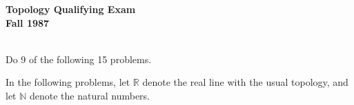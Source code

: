 \documentclass{article}
\def\R{\mathbb R}
\def\N{\mathbb N}
\begin{document}






\begin{center}\begin{LARGE}
{\bf Topology Qualifying Exam}\\ 
{\bf Fall 1987}\\ \end{LARGE}
\end{center}
\vspace{0.1in}
\noindent\hrulefill\\

Do 9 of the following 15 problems.

In the following problems, let $\R$ denote the real line with the usual
topology, and let $\N$ denote the natural numbers.
\end{document}
